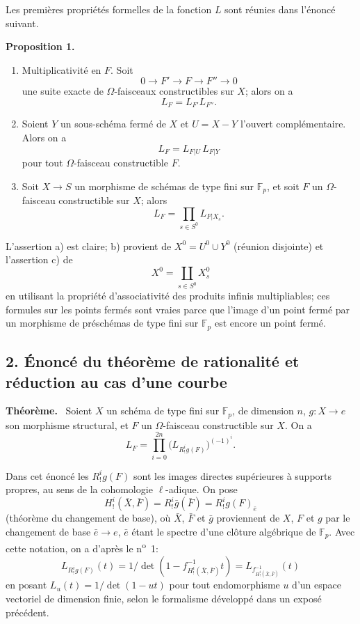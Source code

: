 \documentclass[11pt]{article}
\newenvironment{statement}[1]{\par\medskip\noindent\textbf{#1.}\ }{\par\medskip}
\begin{document}
Les premières propriétés formelles de la fonction $L$ sont réunies dans l'énoncé suivant.

\begin{statement}{Proposition 1}
\begin{enumerate}[label=\alph*)]
\item Multiplicativité en $F$. Soit
\[
0\longrightarrow F'\longrightarrow F\longrightarrow F''\longrightarrow0
\]
une suite exacte de $\Omega$-faisceaux constructibles sur $X$; alors on a
\[
L_F=L_{F'}L_{F''}.
\]
\item Soient $Y$ un sous-schéma fermé de $X$ et $U=X-Y$ l'ouvert complémentaire. Alors on a
\[
L_F=L_{F|U}\,L_{F|Y}
\]
pour tout $\Omega$-faisceau constructible $F$.
\item Soit $X\to S$ un morphisme de schémas de type fini sur $\mathbb F_p$, et soit $F$ un $\Omega$-faisceau constructible sur $X$; alors
\[
L_F=\prod_{s\in S^0}L_{F|X_s}.
\]
\end{enumerate}
\end{statement}

L'assertion a) est claire; b) provient de $X^0=U^0\cup Y^0$ (réunion disjointe) et l'assertion c) de
\[
X^0=\coprod_{s\in S^0}X_s^0
\]
en utilisant la propriété d'associativité des produits infinis multipliables; ces formules sur les points fermés sont vraies parce que l'image d'un point fermé par un morphisme de préschémas de type fini sur $\mathbb F_p$ est encore un point fermé.

\subsection*{2. Énoncé du théorème de rationalité et réduction au cas d'une courbe}

\begin{statement}{Théorème}
Soient $X$ un schéma de type fini sur $\mathbb F_p$, de dimension $n$, $g:X\to e$ son morphisme structural, et $F$ un $\Omega$-faisceau constructible sur $X$. On a
\[
L_F=\prod_{i=0}^{2n}\bigl(L_{R^i_!g(F)}\bigr)^{(-1)^i}.
\tag{1}
\]
\end{statement}

Dans cet énoncé les $R^i_!g(F)$ sont les images directes supérieures à supports propres, au sens de la cohomologie $\ell$-adique. On pose
\[
H^i_!(\bar X,\bar F)=R^i_!\bar g(\bar F)=R^i_!g(F)_{\bar e}
\]
(théorème du changement de base), où $\bar X$, $\bar F$ et $\bar g$ proviennent de $X$, $F$ et $g$ par le changement de base $\bar e\to e$, $\bar e$ étant le spectre d'une clôture algébrique de $\mathbb F_p$. Avec cette notation, on a d'après le n\textsuperscript{o}~1:
\[
L_{R^i_!g(F)}(t)=1/\det(1-f^{-1}_{H^i_!(\bar X,\bar F)}t)
 =L_{f^{-1}_{H^i_!(\bar X,\bar F)}}(t)
\]
en posant $L_u(t)=1/\det(1-ut)$ pour tout endomorphisme $u$ d'un espace vectoriel de dimension finie, selon le formalisme développé dans un exposé précédent.
\end{document}
